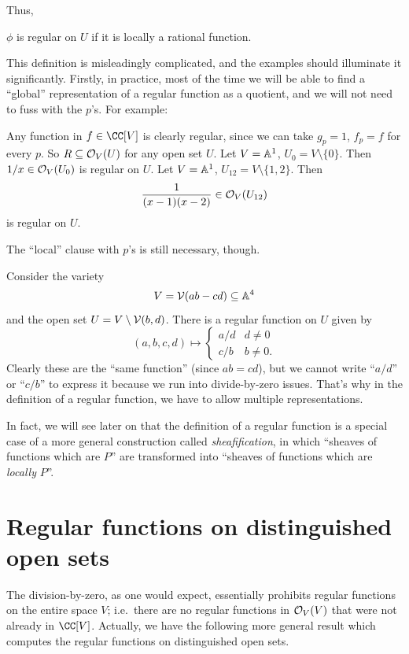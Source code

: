 \documentclass[11pt]{scrreprt}
\begin{document}
Thus,
\begin{moral}
	$\phi$ is regular on $U$ if it is locally a rational function.
\end{moral}

This definition is misleadingly complicated,
and the examples should illuminate it significantly.
Firstly, in practice, most of the time we will be able to find
a ``global'' representation of a regular function as a quotient,
and we will not need to fuss with the $p$'s.
For example:
\begin{example}
	\listhack
	\begin{enumerate}[(a)]
		\ii Any function in $f \in \CC[V]$ is clearly regular,
		since we can take $g_p = 1$, $f_p = f$ for every $p$.
		So $R \subseteq \mathcal O_V(U)$ for any open set $U$.
		\ii Let $V = \mathbb A^1$, $U_0 = V \setminus \{0\}$.
		Then $1/x \in \mathcal O_V(U_0)$ is regular on $U$.
		\ii Let $V = \mathbb A^1$, $U_{12} = V \setminus \{1,2\}$. Then 
		\[ \frac{1}{(x-1)(x-2)} \in \mathcal O_V(U_{12}) \]
		is regular on $U$.
	\end{enumerate}
\end{example}
The ``local'' clause with $p$'s is still necessary, though.
\begin{example}
	\label{ex:local_rep}
	Consider the variety
	\[ V = \mathcal V(ab-cd) \subseteq \mathbb A^4 \]
	and the open set $U = V \setminus \mathcal V(b,d)$.
	There is a regular function on $U$ given by
	\[
		(a,b,c,d)
		\mapsto
		\begin{cases}
			a/d & d \neq 0 \\
			c/b & b \neq 0.
		\end{cases}
	\]
	Clearly these are the ``same function'' (since $ab=cd$),
	but we cannot write ``$a/d$'' or ``$c/b$''
	to express it because we run into divide-by-zero issues.
	That's why in the definition of a regular function,
	we have to allow multiple representations.
\end{example}

In fact, we will see later on that the definition
of a regular function is a special case of a more
general construction called \emph{sheafification},
in which ``sheaves of functions which are $P$'' are transformed
into ``sheaves of functions which are \emph{locally} $P$''.

\section{Regular functions on distinguished open sets}
The division-by-zero, as one would expect,
essentially prohibits regular functions on the entire space $V$;
i.e.\ there are no regular functions in $\mathcal O_V(V)$
that were not already in $\CC[V]$.
Actually, we have the following more general result which computes the
regular functions on distinguished open sets.
\end{document}
